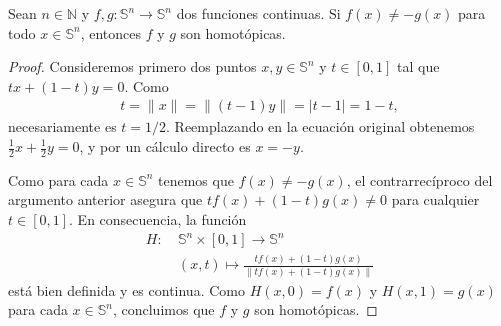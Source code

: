 \documentclass[11pt]{article}
\newcommand{\N}{\mathbb{N}}
\newcommand{\Ss}{\mathbb{S}}
\newcommand{\paint}[2]{\color{#1}{#2}}
\newenvironment{lemma}[2][Lema]{\begin{trivlist}
\item[\hskip \labelsep \paint{orange}{{\bfseries #1}}\hskip \labelsep {\bfseries #2.}]}{\end{trivlist}}
\begin{document}
\begin{lemma}{4} Sean $n \in \N$ y $f,g : \Ss^n \to \Ss^n$ dos funciones continuas. Si $f(x) \neq -g(x)$ para todo $x \in \Ss^n$, entonces $f$ y $g$ son homot\'opicas.
\end{lemma}
\begin{proof} Consideremos primero dos puntos $x,y \in \Ss^n$ y $t \in [0,1]$  tal que $tx + (1-t)y = 0$. Como 
\begin{align*}
t = \|x\| = \|(t-1)y\| = |t-1| = 1-t,
\end{align*}
necesariamente es $t = 1/2$. Reemplazando en la ecuaci\'on original obtenemos $\frac{1}{2}x + \frac{1}{2}y = 0$, y por un c\'alculo directo es $x = -y$. 

Como para cada $x \in \Ss^n$ tenemos que $f(x) \neq -g(x)$, el contrarrec\'iproco del argumento anterior asegura que $tf(x) + (1-t)g(x) \neq 0$ para cualquier $t \in [0,1]$. En consecuencia, la funci\'on
\begin{align*}
H : \ &\Ss^n \times [0,1] \longrightarrow \Ss^n \\
&(x,t) \mapsto \frac{tf(x) + (1-t)g(x)}{\|tf(x) + (1-t)g(x)\|}
\end{align*}
est\'a bien definida y es continua. Como $H(x,0) = f(x)$ y $H(x,1) = g(x)$ para cada $x \in \Ss^n$, concluimos que $f$ y $g$ son homot\'opicas.
\end{proof}
\end{document}
